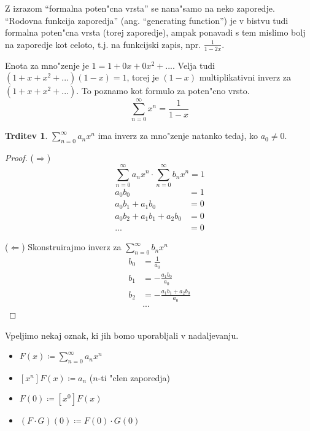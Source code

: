 \documentclass[a4paper,12pt]{article}
\theoremstyle{definition}
\newtheorem{claim}[counter]{Trditev}
\theoremstyle{remark}
\newcommand{\R}{\mathbb{R}}
\begin{document}
Z izrazom ``formalna poten"cna vrsta'' se nana"samo na neko zaporedje. ``Rodovna funkcija zaporedja'' (ang. ``generating function'') je v bistvu tudi formalna poten"cna vrsta (torej zaporedje), ampak ponavadi s tem mislimo bolj na zaporedje kot celoto, t.j. na funkcijski zapis, npr. $\frac{1}{1-2x}$.

Enota za mno"zenje je $1 = 1 + 0 x + 0 x^2 + ...$. Velja tudi $(1 + x + x^2 + ...) (1 - x) = 1$, torej je $(1 - x)$ multiplikativni inverz za $(1 + x + x^2 + ...)$. To poznamo kot formulo za poten"cno vrsto.
\[\sum_{n = 0}^{\infty} x^n = \frac{1}{1 - x}\]

\begin{claim}
    $\sum_{n = 0}^{\infty} a_n x^n$ ima inverz za mno"zenje natanko tedaj, ko $a_0 \neq 0$.
\end{claim}

\begin{proof}
    ($\Rightarrow$)
    \[\sum_{n = 0}^{\infty} a_n x^n \cdot \sum_{n = 0}^{\infty} b_n x^n = 1\]
    \begin{align*}
        a_0 b_0 &= 1\\
        a_0 b_1 + a_1 b_0 &= 0\\
        a_0 b_2 + a_1 b_1 + a_2 b_0 &= 0\\
        ... &= 0
    \end{align*}
    
    ($\Leftarrow$)
    Skonstruirajmo inverz za $\sum_{n = 0}^{\infty} b_n x^n$
    \begin{align*}
        b_0 &= \frac{1}{a_0}\\
        b_1 &= -\frac{a_1 b_0}{a_0}\\
        b_2 &= - \frac{a_1 b_1 + a_2 b_0}{a_0}\\
        &...
    \end{align*}
\end{proof}

Vpeljimo nekaj oznak, ki jih bomo uporabljali v nadaljevanju.
\begin{itemize}
    \item[] $F(x) \coloneqq \sum_{n = 0}^{\infty} a_n x^n$
    \item[] $[x^n]F(x) \coloneqq a_n$ ($n$-ti "clen zaporedja)
    \item[] $F(0) \coloneqq [x^0]F(x)$
    \item[] $(F \cdot G)(0) \coloneqq F(0) \cdot G(0)$
\end{itemize}
\end{document}
